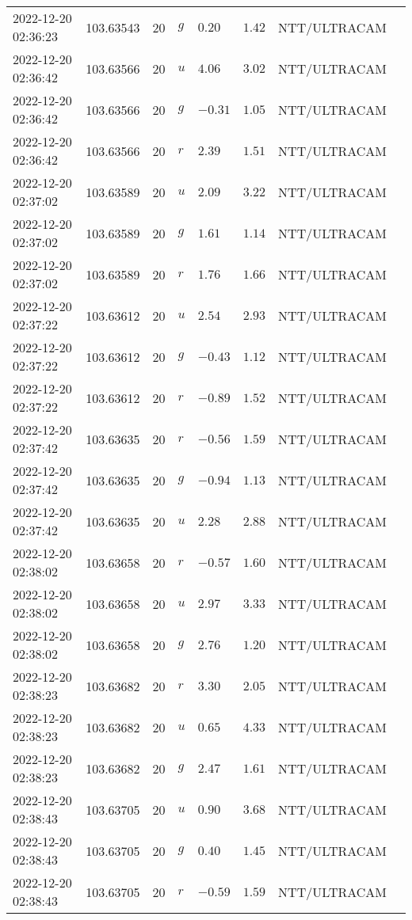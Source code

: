 \documentclass{nature_plusfigure}
\begin{document}
\begin{supplement}
\begin{center}
\begin{longtable}{llllllll}
2022-12-20 02:36:23 & 103.63543 & 20 & $g$ & $0.20$ & $1.42$ & NTT/ULTRACAM &  \\ 
2022-12-20 02:36:42 & 103.63566 & 20 & $u$ & $4.06$ & $3.02$ & NTT/ULTRACAM &  \\ 
2022-12-20 02:36:42 & 103.63566 & 20 & $g$ & $-0.31$ & $1.05$ & NTT/ULTRACAM &  \\ 
2022-12-20 02:36:42 & 103.63566 & 20 & $r$ & $2.39$ & $1.51$ & NTT/ULTRACAM &  \\ 
2022-12-20 02:37:02 & 103.63589 & 20 & $u$ & $2.09$ & $3.22$ & NTT/ULTRACAM &  \\ 
2022-12-20 02:37:02 & 103.63589 & 20 & $g$ & $1.61$ & $1.14$ & NTT/ULTRACAM &  \\ 
2022-12-20 02:37:02 & 103.63589 & 20 & $r$ & $1.76$ & $1.66$ & NTT/ULTRACAM &  \\ 
2022-12-20 02:37:22 & 103.63612 & 20 & $u$ & $2.54$ & $2.93$ & NTT/ULTRACAM &  \\ 
2022-12-20 02:37:22 & 103.63612 & 20 & $g$ & $-0.43$ & $1.12$ & NTT/ULTRACAM &  \\ 
2022-12-20 02:37:22 & 103.63612 & 20 & $r$ & $-0.89$ & $1.52$ & NTT/ULTRACAM &  \\ 
2022-12-20 02:37:42 & 103.63635 & 20 & $r$ & $-0.56$ & $1.59$ & NTT/ULTRACAM &  \\ 
2022-12-20 02:37:42 & 103.63635 & 20 & $g$ & $-0.94$ & $1.13$ & NTT/ULTRACAM &  \\ 
2022-12-20 02:37:42 & 103.63635 & 20 & $u$ & $2.28$ & $2.88$ & NTT/ULTRACAM &  \\ 
2022-12-20 02:38:02 & 103.63658 & 20 & $r$ & $-0.57$ & $1.60$ & NTT/ULTRACAM &  \\ 
2022-12-20 02:38:02 & 103.63658 & 20 & $u$ & $2.97$ & $3.33$ & NTT/ULTRACAM &  \\ 
2022-12-20 02:38:02 & 103.63658 & 20 & $g$ & $2.76$ & $1.20$ & NTT/ULTRACAM &  \\ 
2022-12-20 02:38:23 & 103.63682 & 20 & $r$ & $3.30$ & $2.05$ & NTT/ULTRACAM &  \\ 
2022-12-20 02:38:23 & 103.63682 & 20 & $u$ & $0.65$ & $4.33$ & NTT/ULTRACAM &  \\ 
2022-12-20 02:38:23 & 103.63682 & 20 & $g$ & $2.47$ & $1.61$ & NTT/ULTRACAM &  \\ 
2022-12-20 02:38:43 & 103.63705 & 20 & $u$ & $0.90$ & $3.68$ & NTT/ULTRACAM &  \\ 
2022-12-20 02:38:43 & 103.63705 & 20 & $g$ & $0.40$ & $1.45$ & NTT/ULTRACAM &  \\ 
2022-12-20 02:38:43 & 103.63705 & 20 & $r$ & $-0.59$ & $1.59$ & NTT/ULTRACAM &  \\ 

\end{longtable}
\end{center}
\end{supplement}
\end{document}
